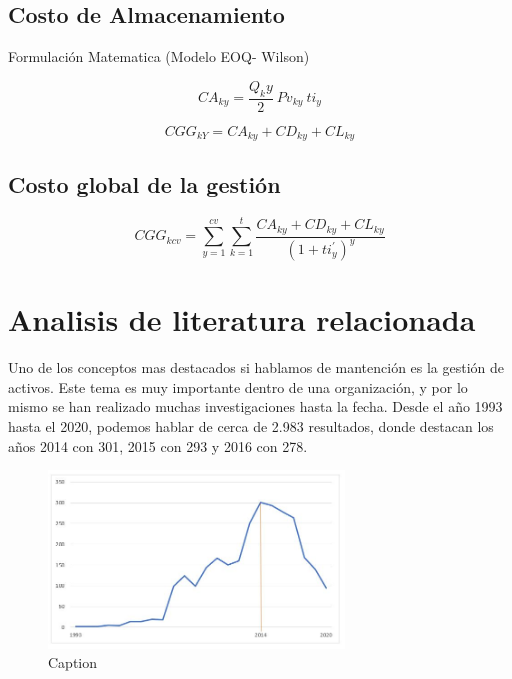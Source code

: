 \documentclass[]{article}
\begin{document}
\subsection{Costo de Almacenamiento}


Formulación Matematica (Modelo EOQ- Wilson)

\begin{equation}
    CA_{ky} = \frac{Q_ky}{2} \ \! Pv_{ky} \ \! ti_{y}
\end{equation}

\begin{equation}
    CGG_{kY} = CA_{ky} + CD_{ky} + CL_{ky}
\end{equation}

\subsection{Costo global de la gestión}

\begin{equation}
    CGG_{kcv} = \sum_{y=1}^{cv}\sum_{k=1}^{t}\frac{CA_{ky} + CD_{ky} + CL_{ky}}{{(1 +ti_{y}^{\prime})}^{y}}
\end{equation}




\hypertarget{analisis-literatura-relacionada}{
\section{Analisis de literatura relacionada }
\label{analisis-literatura-relacionada}}

Uno de los conceptos mas destacados si hablamos de mantención es la gestión de activos. Este tema es muy importante dentro de una organización, y por lo mismo se han realizado muchas investigaciones hasta la fecha.
Desde el año 1993 hasta el 2020, podemos hablar de cerca de 2.983 resultados, donde destacan los años 2014 con 301, 2015 con 293 y 2016 con 278.

\newpage
\begin{figure}[!h]
    \centering
    \includegraphics[width=0.7\textwidth]{1.JPG}
    \caption{Caption}
    \label{fig:my_label}
\end{figure}
\end{document}
